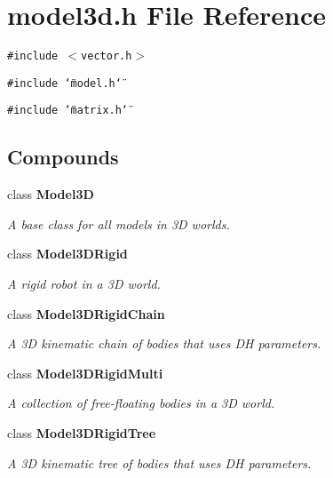 \section{model3d.h File Reference}
\label{model3d_h}
{\tt \#include $<$vector.h$>$}\par
{\tt \#include \char`\"{}model.h\char`\"{}}\par
{\tt \#include \char`\"{}matrix.h\char`\"{}}\par
\subsection*{Compounds}
\begin{CompactItemize}
\item 
class {\bf Model3D}
\begin{CompactList}\small\item\em A base class for all models in 3D worlds.\item\end{CompactList}\item 
class {\bf Model3DRigid}
\begin{CompactList}\small\item\em A rigid robot in a 3D world.\item\end{CompactList}\item 
class {\bf Model3DRigid\-Chain}
\begin{CompactList}\small\item\em A 3D kinematic chain of bodies that uses DH parameters.\item\end{CompactList}\item 
class {\bf Model3DRigid\-Multi}
\begin{CompactList}\small\item\em A collection of free-floating bodies in a 3D world.\item\end{CompactList}\item 
class {\bf Model3DRigid\-Tree}
\begin{CompactList}\small\item\em A 3D kinematic tree of bodies that uses DH parameters.\item\end{CompactList}\end{CompactItemize}
